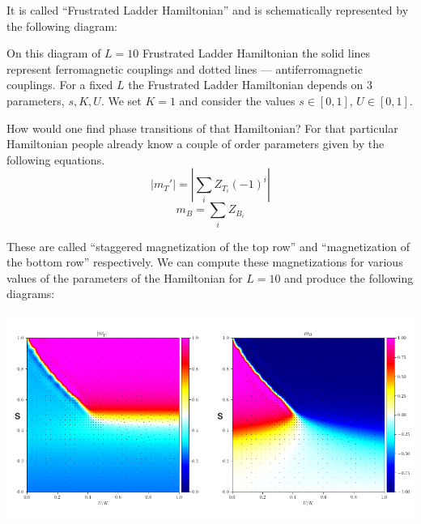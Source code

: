 \documentclass[
  american,aps,pra,reprint,floatfix,nofootinbib,superscriptaddress
]{revtex4-2}
\newcommand{\abs}[1]{\left|#1\right|}
\newcommand{\absmt}{\abs{m_{T}'}}
\begin{document}
It is called ``Frustrated Ladder Hamiltonian'' and is schematically represented
by the following diagram:
\begin{center}
  \pgfmathparse{\columnwidth/10.7cm}%
  \edef\tikzscale{\pgfmathresult}%
\end{center}
On this diagram of $L=10$ Frustrated Ladder Hamiltonian
the solid lines represent ferromagnetic couplings and
dotted lines --- antiferromagnetic couplings. For a fixed $L$
the Frustrated Ladder Hamiltonian depends on 3 parameters, $s, K, U$.
We set $K=1$ and consider the values $s\in[0,1]$, $U\in[0,1]$.

How would one find phase transitions of that Hamiltonian? For that particular
Hamiltonian people already know a couple of order parameters given by the
following equations.
\begin{equation}
  \label{eq:mt}
  \absmt = \abs{\sum_i Z_{T_i}(-1)^i}
\end{equation}
\begin{equation}
  \label{eq:mb}
  m_B = \sum_i Z_{B_i}
\end{equation}

These are called ``staggered magnetization of the top row'' and ``magnetization
of the bottom row'' respectively. We can compute these magnetizations for various
values of the parameters of the Hamiltonian for $L=10$ and produce the
following diagrams:

\includegraphics[width=\dimexpr\columnwidth-10.0pt]{lanczos_chi0_gp.png}
\end{document}
